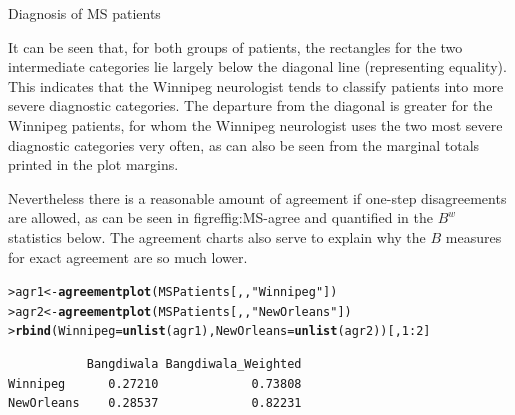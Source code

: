 \documentclass[10pt,krantz2]{krantz}\usepackage[]{graphicx}\usepackage[]{color}
\makeatletter
\newcommand{\hlnum}[1]{\textcolor[rgb]{0.686,0.059,0.569}{#1}}%
\newcommand{\hlstr}[1]{\textcolor[rgb]{0.192,0.494,0.8}{#1}}%
\newcommand{\hlopt}[1]{\textcolor[rgb]{0,0,0}{#1}}%
\newcommand{\hlstd}[1]{\textcolor[rgb]{0.345,0.345,0.345}{#1}}%
\newcommand{\hlkwb}[1]{\textcolor[rgb]{0.69,0.353,0.396}{#1}}%
\newcommand{\hlkwc}[1]{\textcolor[rgb]{0.333,0.667,0.333}{#1}}%
\newcommand{\hlkwd}[1]{\textcolor[rgb]{0.737,0.353,0.396}{\textbf{#1}}}%
\newenvironment{kframe}{%
 \def\at@end@of@kframe{}%
 \ifinner\ifhmode%
  \def\at@end@of@kframe{\end{minipage}}%
  \begin{minipage}{\columnwidth}%
 \fi\fi%
 \def\FrameCommand##1{\hskip\@totalleftmargin \hskip-\fboxsep
 \colorbox{shadecolor}{##1}\hskip-\fboxsep
     \hskip-\linewidth \hskip-\@totalleftmargin \hskip\columnwidth}%
 \MakeFramed {\advance\hsize-\width
   \@totalleftmargin\z@ \linewidth\hsize
   \@setminipage}}%
 {\par\unskip\endMakeFramed%
 \at@end@of@kframe}
\newenvironment{knitrout}{}{} %
\renewenvironment{knitrout}{\small\renewcommand{\baselinestretch}{.85}}{} %
\makeatother
\begin{document}
\begin{Example}[MS2]{Diagnosis of MS patients}
\begin{knitrout}
\end{knitrout}

It can be seen that, for
both groups of patients, the rectangles for the
two intermediate categories lie largely below the diagonal line
(representing equality).  This
indicates that the Winnipeg neurologist tends to classify patients
into more severe diagnostic categories.
The departure from the diagonal is greater for the Winnipeg patients,
for whom the Winnipeg neurologist uses the two most severe diagnostic
categories very often, as can also be seen from the marginal totals
printed in the plot margins.

Nevertheless there is a reasonable amount of agreement if one-step
disagreements are allowed, as can be seen in figref{fig:MS-agree}
and quantified in the $B^w$ statistics below.
The agreement charts also serve to explain why the $B$ measures for
exact agreement are so much lower.
\begin{knitrout}
\color{fgcolor}\begin{kframe}
\begin{alltt}
\hlstd{> }\hlstd{agr1} \hlkwb{<-} \hlkwd{agreementplot}\hlstd{(MSPatients[, ,} \hlstr{"Winnipeg"}\hlstd{])}
\hlstd{> }\hlstd{agr2} \hlkwb{<-} \hlkwd{agreementplot}\hlstd{(MSPatients[, ,} \hlstr{"New Orleans"}\hlstd{])}
\hlstd{> }\hlkwd{rbind}\hlstd{(}\hlkwc{Winnipeg} \hlstd{=} \hlkwd{unlist}\hlstd{(agr1),} \hlkwc{NewOrleans} \hlstd{=} \hlkwd{unlist}\hlstd{(agr2))[,} \hlnum{1} \hlopt{:} \hlnum{2}\hlstd{]}
\end{alltt}
\begin{verbatim}
           Bangdiwala Bangdiwala_Weighted
Winnipeg      0.27210             0.73808
NewOrleans    0.28537             0.82231
\end{verbatim}
\end{kframe}
\end{knitrout}




\end{Example}
\end{document}
